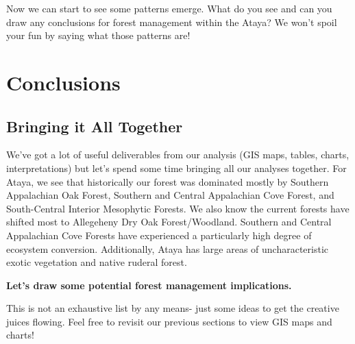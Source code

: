 \documentclass[
]{book}
\begin{document}
Now we can start to see some patterns emerge. What do you see and can you draw any conclusions for forest management within the Ataya? We won't spoil your fun by saying what those patterns are!

\hypertarget{conclusions}{%
\chapter{Conclusions}\label{conclusions}}

\hypertarget{bringing-it-all-together}{%
\section{Bringing it All Together}\label{bringing-it-all-together}}

We've got a lot of useful deliverables from our analysis (GIS maps, tables, charts, interpretations) but let's spend some time bringing all our analyses together. For Ataya, we see that historically our forest was dominated mostly by Southern Appalachian Oak Forest, Southern and Central Appalachian Cove Forest, and South-Central Interior Mesophytic Forests. We also know the current forests have shifted most to Allegeheny Dry Oak Forest/Woodland. Southern and Central Appalachian Cove Forests have experienced a particularly high degree of ecosystem conversion. Additionally, Ataya has large areas of uncharacteristic exotic vegetation and native ruderal forest.

\textbf{Let's draw some potential forest management implications.}

This is not an exhaustive list by any means- just some ideas to get the creative juices flowing. Feel free to revisit our previous sections to view GIS maps and charts!
\end{document}
